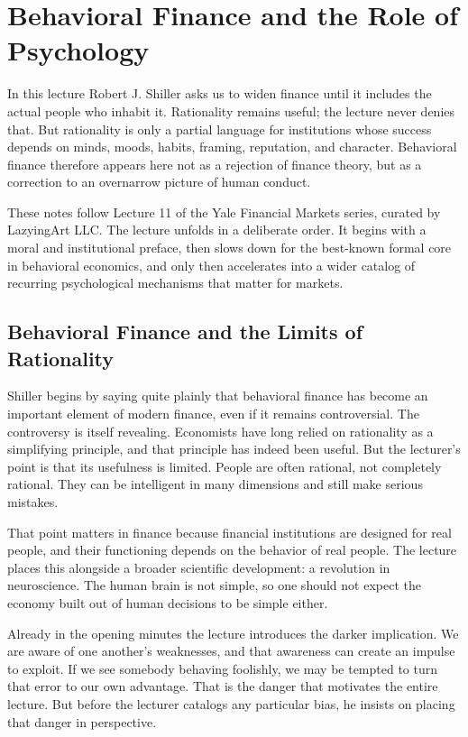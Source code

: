 \chapter{Behavioral Finance and the Role of Psychology}

In this lecture Robert J. Shiller asks us to widen finance until it includes the actual people who inhabit it. Rationality remains useful; the lecture never denies that. But rationality is only a partial language for institutions whose success depends on minds, moods, habits, framing, reputation, and character. Behavioral finance therefore appears here not as a rejection of finance theory, but as a correction to an overnarrow picture of human conduct.

These notes follow Lecture 11 of the Yale Financial Markets series, curated by LazyingArt LLC. The lecture unfolds in a deliberate order. It begins with a moral and institutional preface, then slows down for the best-known formal core in behavioral economics, and only then accelerates into a wider catalog of recurring psychological mechanisms that matter for markets.

\section{Behavioral Finance and the Limits of Rationality}

Shiller begins by saying quite plainly that behavioral finance has become an important element of modern finance, even if it remains controversial. The controversy is itself revealing. Economists have long relied on rationality as a simplifying principle, and that principle has indeed been useful. But the lecturer's point is that its usefulness is limited. People are often rational, not completely rational. They can be intelligent in many dimensions and still make serious mistakes.

That point matters in finance because financial institutions are designed for real people, and their functioning depends on the behavior of real people. The lecture places this alongside a broader scientific development: a revolution in neuroscience. The human brain is not simple, so one should not expect the economy built out of human decisions to be simple either.

Already in the opening minutes the lecture introduces the darker implication. We are aware of one another's weaknesses, and that awareness can create an impulse to exploit. If we see somebody behaving foolishly, we may be tempted to turn that error to our own advantage. That is the danger that motivates the entire lecture. But before the lecturer catalogs any particular bias, he insists on placing that danger in perspective.

